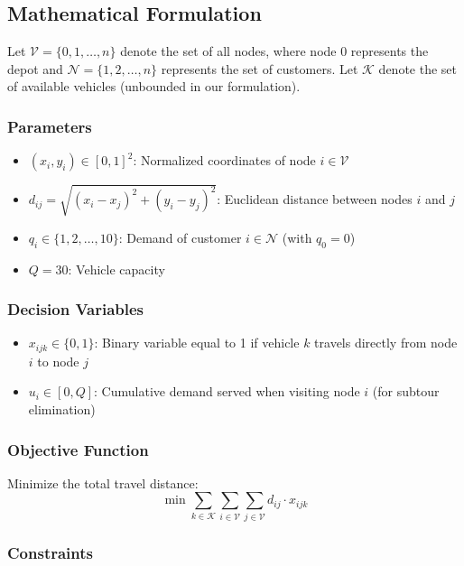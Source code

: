 \documentclass[11pt]{article}
\begin{document}
\subsection{Mathematical Formulation}

Let $\mathcal{V} = \{0, 1, \ldots, n\}$ denote the set of all nodes, where node $0$ represents the depot and $\mathcal{N} = \{1, 2, \ldots, n\}$ represents the set of customers. Let $\mathcal{K}$ denote the set of available vehicles (unbounded in our formulation).

\subsubsection{Parameters}
\begin{itemize}
    \item $(x_i, y_i) \in [0, 1]^2$: Normalized coordinates of node $i \in \mathcal{V}$
    \item $d_{ij} = \sqrt{(x_i - x_j)^2 + (y_i - y_j)^2}$: Euclidean distance between nodes $i$ and $j$
    \item $q_i \in \{1, 2, \ldots, 10\}$: Demand of customer $i \in \mathcal{N}$ (with $q_0 = 0$)
    \item $Q = 30$: Vehicle capacity
\end{itemize}

\subsubsection{Decision Variables}
\begin{itemize}
    \item $x_{ijk} \in \{0, 1\}$: Binary variable equal to 1 if vehicle $k$ travels directly from node $i$ to node $j$
    \item $u_i \in [0, Q]$: Cumulative demand served when visiting node $i$ (for subtour elimination)
\end{itemize}

\subsubsection{Objective Function}
Minimize the total travel distance:
\begin{equation}
\min \sum_{k \in \mathcal{K}} \sum_{i \in \mathcal{V}} \sum_{j \in \mathcal{V}} d_{ij} \cdot x_{ijk}
\end{equation}

\subsubsection{Constraints}
\end{document}

